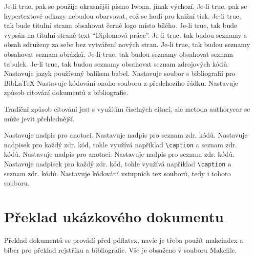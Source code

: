 \documentclass[a4paper,12pt]{article}
\begin{document}
\begin{optionlist}
Je-li true, pak se použije okrasnější písmo Iwona, jinak výchozí.
Je-li true, pak se hypertextové odkazy nebudou obarvovat, což se hodí pro knižní tisk.
Je-li true, tak bude titulní strana obsahovat černé logo místo bílého.
Je-li true, tak bude vypsán na titulní straně text \enquote{Diplomová práce}.
Je-li true, tak budou seznamy a obsah sdruženy za sebe bez vytváření nových stran. 
Je-li true, tak budou seznamy obsahovat seznam obrázků.
Je-li true, tak budou seznamy obsahovat seznam tabulek.
Je-li true, tak budou seznamy obsahovat seznam zdrojových kódů. 
Nastavuje jazyk používaný balíkem babel. 
Nastavuje soubor s bibliografií pro Bib\LaTeX  
{}
Nastavuje kódování onoho souboru z předchozího řádku. 
Nastavuje způsob citování dokumentů z bibliografie.

Tradiční způsob citování jest s využítím číselných citací, ale metoda authoryear se může jevit přehlednější.

Nastavuje nadpis pro anotaci. 
Nastavuje nadpis pro seznam zdr. kódů.
Nastavuje nadpisek pro každý zdr. kód, tohle využívá například \verb|\caption| a seznam zdr. kódů. 
Nastavuje nadpis pro anotaci. 
Nastavuje nadpis pro seznam zdr. kódů.
Nastavuje nadpisek pro každý zdr. kód, tohle využívá například \verb|\caption| a seznam zdr. kódů. 
Nastavuje kódování vstupních tex souborů, tedy i tohoto souboru. 
\end{optionlist}

\section{Překlad ukázkového dokumentu}
Překlad dokumentů se provádí před pdflatex, navíc je třeba použít makeindex a biber pro překlad rejstříku a bibliografie. Vše je obsaženo v souboru Makefile.
\end{document}
